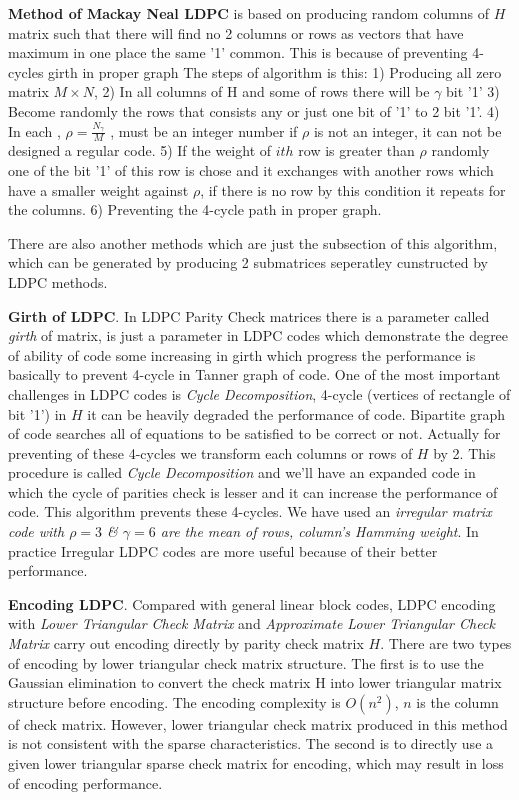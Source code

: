 \textbf{Method of Mackay Neal LDPC} is based on producing random columns of $H$ matrix such that there will find no 2 columns or rows as vectors that have maximum in one place the same '1' common. This is because of preventing 4-cycles girth in proper graph The steps of algorithm is this: 1) Producing all zero matrix $M \times N$, 2) In all columns of H and some of rows there will be $\gamma$ bit '1' 3) Become randomly the rows that consists any or just one bit of '1' to 2 bit '1'. 4) In each , $\rho = \frac{N_{\gamma}}{M}$ , must be an integer number if $\rho$ is not an integer, it can not be designed a regular code. 5) If the weight of $ith$ row is greater than $\rho$ randomly  one of the bit '1' of this row is chose and it exchanges with another rows which have a smaller weight against $\rho$, if there is no row by this condition it repeats for the columns. 6) Preventing the 4-cycle path in proper graph.     

There are also another methods which are just the subsection of this algorithm, which can be generated by producing 2 submatrices seperatley cunstructed by LDPC methods.

\textbf{Girth of LDPC}. In LDPC Parity Check matrices there is a parameter called \textit{girth} of matrix, is just a parameter in LDPC codes which demonstrate the degree of ability of code some increasing in girth which progress the performance is basically to prevent 4-cycle in Tanner graph of code. One of the most important challenges in LDPC codes is \textit{Cycle Decomposition}, 4-cycle (vertices of rectangle of bit '1') in $H$ it can be heavily degraded the performance of code.  Bipartite graph of code searches all of equations to be satisfied to be correct or not. Actually for preventing of these 4-cycles we transform each columns or rows of $H$ by 2. This procedure is called \textit{Cycle Decomposition} and we'll have an expanded code in which the cycle of parities check is lesser and it can increase the performance of code. This algorithm prevents these 4-cycles. We have used an \textit{irregular matrix code with $\rho = 3$ \& $\gamma = 6$ are the mean of rows, column's Hamming weight}. In practice Irregular LDPC codes are more useful because of their better performance.

\textbf{Encoding LDPC}. Compared with general linear block codes, LDPC encoding with \textit{Lower Triangular Check Matrix} and \textit{Approximate Lower Triangular Check Matrix} carry out encoding directly by parity check matrix $H$. There are two types of encoding by lower triangular check matrix structure. The first is to use the Gaussian elimination to convert the check matrix H into lower triangular matrix structure before encoding. The encoding complexity is $O(n^{2} )$, $n$ is the column of check matrix. However, lower triangular check matrix produced in this method is not consistent with the sparse characteristics. The second is to directly use a given lower triangular sparse check matrix for encoding, which may result in loss of encoding performance.

